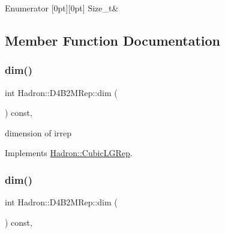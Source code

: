 \begin{DoxyEnumFields}{Enumerator}
[0pt][0pt]{}\mbox{\label{structHadron_1_1D4B2MRep_ad885da2d07cffa9948eb91782b98851cad8c661df2ab9ecdd98d3168081884dd3}} 
Size\+\_\+t&\\
\hline

\end{DoxyEnumFields}


\subsection{Member Function Documentation}
\mbox{\label{structHadron_1_1D4B2MRep_ac21548568caf31696cb786877246f6a3}} 
\subsubsection{\texorpdfstring{dim()}{dim()}\hspace{0.1cm}{\footnotesize\ttfamily [1/3]}}
{\footnotesize\ttfamily int Hadron\+::\+D4\+B2\+M\+Rep\+::dim (\begin{DoxyParamCaption}{ }\end{DoxyParamCaption}) const\hspace{0.3cm}{\ttfamily [inline]}, {\ttfamily [virtual]}}

dimension of irrep 

Implements \mbox{\hyperlink{structHadron_1_1CubicLGRep_a3acbaea26503ed64f20df693a48e4cdd}{Hadron\+::\+Cubic\+L\+G\+Rep}}.

\mbox{\label{structHadron_1_1D4B2MRep_ac21548568caf31696cb786877246f6a3}} 
\subsubsection{\texorpdfstring{dim()}{dim()}\hspace{0.1cm}{\footnotesize\ttfamily [2/3]}}
{\footnotesize\ttfamily int Hadron\+::\+D4\+B2\+M\+Rep\+::dim (\begin{DoxyParamCaption}{ }\end{DoxyParamCaption}) const\hspace{0.3cm}{\ttfamily [inline]}, {\ttfamily [virtual]}}

